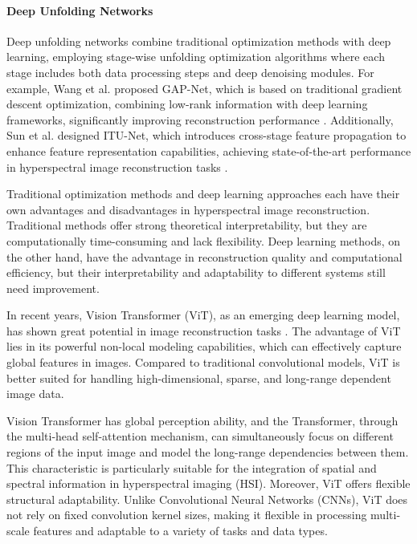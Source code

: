 \documentclass[preprint,review,12pt]{elsarticle}
\begin{document}
\paragraph{Deep Unfolding Networks}

Deep unfolding networks combine traditional optimization methods with deep learning, employing stage-wise unfolding optimization algorithms where each stage includes both data processing steps and deep denoising modules. For example, Wang et al. proposed GAP-Net, which is based on traditional gradient descent optimization, combining low-rank information with deep learning frameworks, significantly improving reconstruction performance \cite{wang2023}. Additionally, Sun et al. designed ITU-Net, which introduces cross-stage feature propagation to enhance feature representation capabilities, achieving state-of-the-art performance in hyperspectral image reconstruction tasks \cite{sun2024}.

Traditional optimization methods and deep learning approaches each have their own advantages and disadvantages in hyperspectral image reconstruction. Traditional methods offer strong theoretical interpretability, but they are computationally time-consuming and lack flexibility. Deep learning methods, on the other hand, have the advantage in reconstruction quality and computational efficiency, but their interpretability and adaptability to different systems still need improvement.

In recent years, Vision Transformer (ViT), as an emerging deep learning model, has shown great potential in image reconstruction tasks \cite{dosovitskiy2020}. The advantage of ViT lies in its powerful non-local modeling capabilities, which can effectively capture global features in images. Compared to traditional convolutional models, ViT is better suited for handling high-dimensional, sparse, and long-range dependent image data.

Vision Transformer has global perception ability, and the Transformer, through the multi-head self-attention mechanism, can simultaneously focus on different regions of the input image and model the long-range dependencies between them. This characteristic is particularly suitable for the integration of spatial and spectral information in hyperspectral imaging (HSI). Moreover, ViT offers flexible structural adaptability. Unlike Convolutional Neural Networks (CNNs), ViT does not rely on fixed convolution kernel sizes, making it flexible in processing multi-scale features and adaptable to a variety of tasks and data types.
\end{document}
